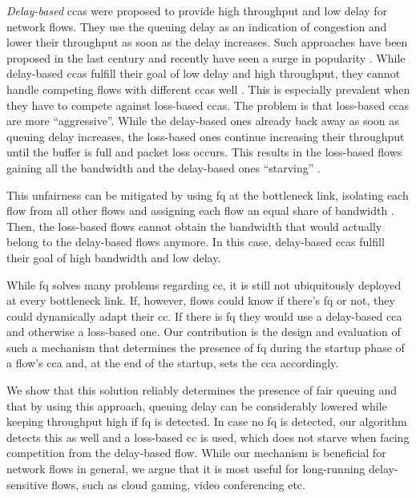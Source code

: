 \documentclass[runningheads]{llncs}
\begin{document}
\textit{Delay-based} \glspl{cca} were proposed to provide high throughput and low delay for network flows. They use the queuing delay as an indication of congestion and lower their throughput as soon as the delay increases. Such approaches have been proposed in the last century \cite{brakmo_tcp_1995} and recently have seen a surge in popularity \cite{arun_copa_2018,hock_tcp_2017,mittal_timely_2015,cardwell_bbr:_2016}. While delay-based \glspl{cca} fulfill their goal of low delay and high throughput, they cannot handle competing flows with different \glspl{cca} well \cite{turkovic_fifty_2019, turkovic_interactions_2019}. This is especially prevalent when they have to compete against loss-based \glspl{cca}. The problem is that loss-based \glspl{cca} are more ``aggressive''. While the delay-based ones already back away as soon as queuing delay increases, the loss-based ones continue increasing their throughput until the buffer is full and packet loss occurs. This results in the loss-based flows gaining all the bandwidth and the delay-based ones ``starving'' \cite{hock_toward_2016,yuan-cheng_lai_improving_2001,awdeh_comparing_2004}.

This unfairness can be mitigated by using \gls{fq} at the bottleneck link, isolating each flow from all other flows and assigning each flow an equal share of bandwidth \cite{dumazet_pkt_sched:_2013}. Then, the loss-based flows cannot obtain the bandwidth that would actually belong to the delay-based flows anymore. In this case, delay-based \glspl{cca} fulfill their goal of high bandwidth and low delay. 

While \gls{fq} solves many problems regarding \gls{cc}, it is still not ubiquitously deployed at every bottleneck link. If, however, flows could know if there's \gls{fq} or not, they could dynamically adapt their \gls{cc}. If there is \gls{fq} they would use a delay-based \gls{cca} and otherwise a loss-based one. Our contribution is the design and evaluation of such a mechanism that determines the presence of \gls{fq} during the startup phase of a flow's \gls{cca} and, at the end of the startup, sets the \gls{cca} accordingly. 

We show that this solution reliably determines the presence of fair queuing and that by using this approach, queuing delay can be considerably lowered while keeping throughput high if \gls{fq} is detected. In case no \gls{fq} is detected, our algorithm detects this as well and a loss-based \gls{cc} is used, which does not starve when facing competition from the delay-based flow. While our mechanism is beneficial for network flows in general, we argue that it is most useful for long-running delay-sensitive flows, such as cloud gaming, video conferencing etc. 
\end{document}
